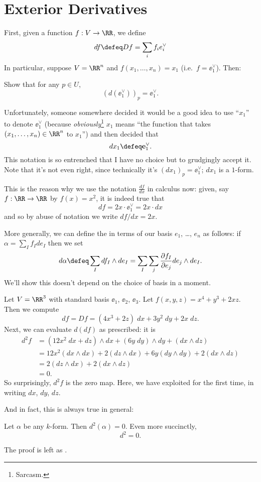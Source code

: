 \documentclass[11pt]{scrreprt}
\begin{document}
\section{Exterior Derivatives}
First, given a function $f : V \to \RR$,
we define 
\[ df \defeq Df = \sum_i f_i e_i^\vee \]
In particular, suppose $V = \RR^n$ and $f(x_1, \dots, x_n) = x_1$ (i.e.\ $f = \ee_1^\vee$). Then:
\begin{ques}
	Show that for any $p \in U$, \[ \left( d(\ee_1^\vee) \right)_p = \ee_1^\vee. \]
\end{ques}
\begin{abuse}
	Unfortunately, someone somewhere decided it would be a good idea to use ``$x_1$'' to denote $\ee_1^\vee$
	(because \emph{obviously}\footnote{Sarcasm.} $x_1$ means
	``the function that takes $(x_1, \dots, x_n) \in \RR^n$ to $x_1$'')
	and then decided that \[ dx_1 \defeq \ee_1^\vee. \]
	This notation is so entrenched that I have no choice but to grudgingly accept it.
	Note that it's not even right, since technically it's $(dx_1)_p = \ee_1^\vee$; $dx_1$ is a $1$-form.
	\label{abuse:dx}
\end{abuse}
\begin{remark}
	This is the reason why we use the notation $\frac{df}{dx}$ in calculus now:
	given, say $f : \RR \to \RR$ by $f(x) = x^2$, it is indeed true that
	\[ df = 2x \cdot \ee_1^\vee = 2x \cdot dx \]
	and so by abuse of notation we write $df/dx = 2x$.
\end{remark}

More generally, we can define the  in terms of our basis $e_1$, \dots, $e_n$ as follows:
if $\alpha = \sum_I f_I de_I$ then we set
\[ d\alpha \defeq \sum_I df_I \wedge de_I = \sum_I \sum_j \fpartial{f_I}{e_j} de_j \wedge de_I. \]
We'll show this doesn't depend on the choice of basis in a moment.

\begin{example}
	Let $V = \RR^3$ with standard basis $\ee_1$, $\ee_2$, $\ee_3$.
	Let $f(x,y,z) = x^4 + y^3 + 2xz$.
	Then we compute
	\[ df = Df = (4x^3+2z) \; dx + 3y^2 \; dy + 2x \; dz. \]
	Next, we can evaluate $d(df)$ as prescribed: it is
	\begin{align*}
		d^2f &= (12x^2 \; dx + dz) \wedge dx + (6y \; dy) \wedge dy + (dx \wedge dz) \\
		&= 12x^2 (dx \wedge dx) + 2(dz \wedge dx) + 6y (dy \wedge dy) + 2(dx \wedge dz) \\
		&= 2(dz \wedge dx) + 2(dx \wedge dz) \\
		&= 0.
	\end{align*}
	So surprisingly, $d^2f$ is the zero map.
	Here, we have exploited  for the first time,
	in writing $dx$, $dy$, $dz$.
\end{example}
And in fact, this is always true in general:
\begin{theorem}
	\label{thm:dd_zero}
	Let $\alpha$ be any $k$-form.
	Then $d^2(\alpha) = 0$.
	Even more succinctly, \[ d^2 = 0. \]
\end{theorem}
The proof is left as .
\end{document}
